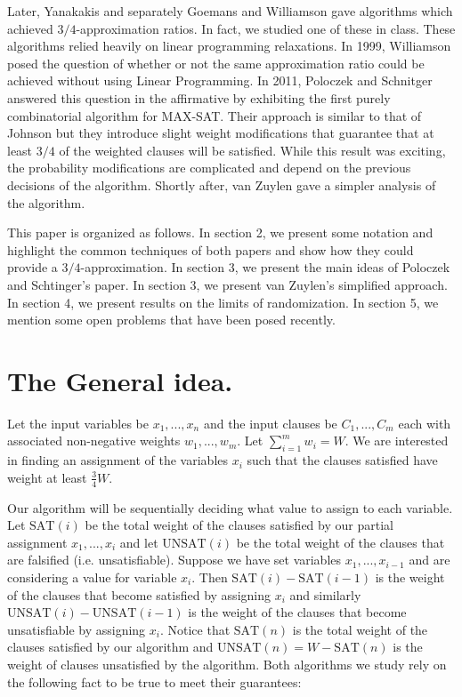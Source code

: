 \documentclass[11pt,letter]{article}
\begin{document}
Later, Yanakakis \cite{Yannakakis1994475} and separately Goemans and Williamson \cite{Goemans94new3/4-approximation}
gave algorithms which achieved $3/4$-approximation ratios. In fact, we studied one of these in class.
These algorithms relied heavily on linear programming relaxations. In 1999, Williamson posed the question
of whether or not the same approximation ratio could be achieved without using Linear Programming. In 2011,
Poloczek and Schnitger \cite{Poloczek:2011:RVJ:2133036.2133087} answered this question in the affirmative
by exhibiting the first purely combinatorial algorithm for MAX-SAT. Their approach is similar to that of Johnson
but they introduce slight weight modifications that guarantee that at least $3/4$ of the weighted clauses will be satisfied.
 While this result was exciting, the probability modifications are complicated and depend on the previous decisions
  of the algorithm. Shortly after, van Zuylen \cite{vanZuylen:2011:SAM:2238496.2238512} gave a simpler analysis of the algorithm.

This paper is organized as follows. In section 2, we present some notation and highlight the common techniques of both papers
and show how they could provide a $3/4$-approximation. In section 3, we present the main ideas
of Poloczek and Schtinger's paper. In section 3, we present van Zuylen's simplified approach.
In section 4, we present results on the limits of randomization.
In section 5, we mention some open problems that have been posed recently.

\section{The General idea.}

Let the input variables be $x_1,...,x_n$ and the input clauses be $C_1,...,C_m$
each with associated non-negative weights $w_1,...,w_m$. Let $\sum_{i=1}^{m} w_i = W$.
We are interested in finding an assignment of the variables $x_i$ such that the clauses satisfied have weight at least $\frac{3}{4}W$.

Our algorithm will be sequentially deciding what value to assign to each variable. Let $\text{SAT}(i)$ be the total weight of the clauses
satisfied by our partial assignment $x_1, ..., x_i$ and let $\text{UNSAT}(i)$ be the total weight of the clauses that are falsified (i.e. unsatisfiable).
Suppose we have set variables $x_1,...,x_{i-1}$ and are considering a value for variable $x_i$. Then $\text{SAT}(i)-\text{SAT}(i-1)$ is the weight
of the clauses that become satisfied by assigning $x_i$ and similarly $\text{UNSAT}(i) - \text{UNSAT}(i-1)$ is the weight of the clauses that become
unsatisfiable by assigning $x_i$.
Notice that $\text{SAT}(n)$ is the total weight of the clauses satisfied by our algorithm and $\text{UNSAT}(n) = W - \text{SAT}(n)$ is the weight of clauses
unsatisfied by the algorithm. Both algorithms we study rely on the following fact to be true to meet their guarantees:
\end{document}
